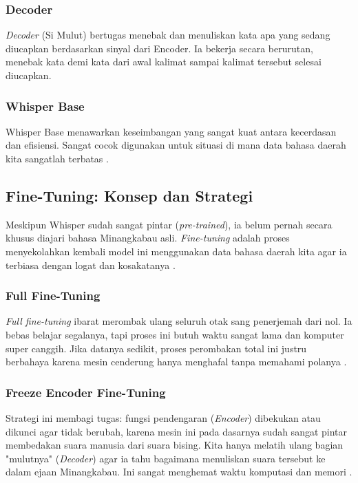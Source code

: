 \subsubsection{Decoder}

\textit{Decoder} (Si Mulut) bertugas menebak dan menuliskan kata apa yang sedang diucapkan berdasarkan sinyal dari Encoder. Ia bekerja secara berurutan, menebak kata demi kata dari awal kalimat sampai kalimat tersebut selesai diucapkan.

\subsubsection{Whisper Base}

Whisper Base menawarkan keseimbangan yang sangat kuat antara kecerdasan dan efisiensi. Sangat cocok digunakan untuk situasi di mana data bahasa daerah kita sangatlah terbatas \cite{liu2024exploration}.

\subsection{Fine-Tuning: Konsep dan Strategi}
\label{II.FineTuning}

Meskipun Whisper sudah sangat pintar (\textit{pre-trained}), ia belum pernah secara khusus diajari bahasa Minangkabau asli. \textit{Fine-tuning} adalah proses menyekolahkan kembali model ini menggunakan data bahasa daerah kita agar ia terbiasa dengan logat dan kosakatanya \cite{liu2024exploration,timmel2024finetune}.

\subsubsection{Full Fine-Tuning}

\textit{Full fine-tuning} ibarat merombak ulang seluruh otak sang penerjemah dari nol. Ia bebas belajar segalanya, tapi proses ini butuh waktu sangat lama dan komputer super canggih. Jika datanya sedikit, proses perombakan total ini justru berbahaya karena mesin cenderung hanya menghafal tanpa memahami polanya \cite{liu2024exploration}.

\subsubsection{Freeze Encoder Fine-Tuning}

Strategi ini membagi tugas: fungsi pendengaran (\textit{Encoder}) dibekukan atau dikunci agar tidak berubah, karena mesin ini pada dasarnya sudah sangat pintar membedakan suara manusia dari suara bising. Kita hanya melatih ulang bagian "mulutnya" (\textit{Decoder}) agar ia tahu bagaimana menuliskan suara tersebut ke dalam ejaan Minangkabau. Ini sangat menghemat waktu komputasi dan memori \cite{liu2024exploration,timmel2024finetune}.

